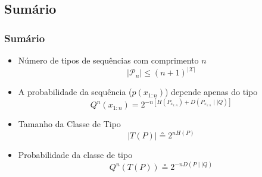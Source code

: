 \subsection{Sumário}
\begin{frame}[allowframebreaks]
  \frametitle{Sumário}
   \begin{itemize}
   \item Número de tipos de sequências com comprimento $n$
	\begin{equation}
	\vert \mathcal{P}_n \vert \leq (n+1)^{\vert \mathcal{X} \vert}
	\end{equation}
   \item A probabilidade da sequência ($p(x_{1:n})$) depende apenas do tipo 
	\begin{equation}
	Q^n(x_{1:n}) = 2^{-n [H(P_{x_{1:n}}) + D(P_{x_{1:n}} \mid \mid Q)]}
	\end{equation}
   \item Tamanho da Classe de Tipo
	\begin{equation}
	\vert T(P) \vert \circeq 2^{nH(P)}
        \end{equation}
   \item Probabilidade da classe de tipo
	\begin{equation}
	Q^n(T(P)) \circeq 2^{-nD(P \mid\mid Q)}
	\end{equation}
   \end{itemize}
\end{frame}



